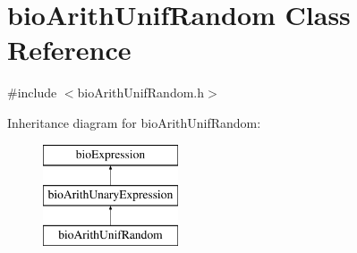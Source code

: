 \hypertarget{classbio_arith_unif_random}{}\section{bio\+Arith\+Unif\+Random Class Reference}
\label{classbio_arith_unif_random}


{\ttfamily \#include $<$bio\+Arith\+Unif\+Random.\+h$>$}

Inheritance diagram for bio\+Arith\+Unif\+Random\+:\begin{figure}[H]
\begin{center}
\leavevmode
\includegraphics[height=3.000000cm]{classbio_arith_unif_random}
\end{center}
\end{figure}
